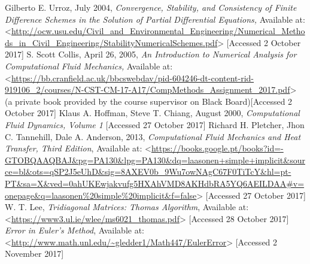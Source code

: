 \documentclass[12pt]{report}
\begin{document}
Gilberto E. Urroz, July 2004, \textit{Convergence, Stability, and Consistency of Finite
Difference Schemes in the Solution of Partial Differential
Equations,} Available at: <\url{http://ocw.usu.edu/Civil_and_Environmental_Engineering/Numerical_Methods_in_Civil_Engineering/StabilityNumericalSchemes.pdf}> [Accessed 2 October 2017]
\newline
\newline
S. Scott Collis, April 26, 2005, \textit{An Introduction to Numerical Analysis
for Computational Fluid Mechanics,} Available at: <\url{https://bb.cranfield.ac.uk/bbcswebdav/pid-604246-dt-content-rid-919106_2/courses/N-CST-CM-17-A17/CompMethods_Assignment_2017.pdf}> (a private book provided by the course supervisor on Black Board)[Accessed 2 October 2017]
\newline
\newline
Klaus A. Hoffman, Steve T. Chiang, August 2000, \textit{Computational Fluid Dynamics, Volume 1} [Accessed 27 October 2017]
\newline
\newline
Richard H. Pletcher, Jhon C. Tannehill, Dale A. Anderson, 2013, \textit{Computational Fluid Mechanics and Heat Transfer, Third Edition}, Available at: <\url{https://books.google.pt/books?id=-GTOBQAAQBAJ&pg=PA130&lpg=PA130&dq=laasonen+simple+implicit&source=bl&ots=qSP2J5eUhD&sig=8AXEV0b_9Wu7owNAgC67F0TiTcY&hl=pt-PT&sa=X&ved=0ahUKEwjakvufg5HXAhVMD8AKHdbRA5YQ6AEILDAA#v=onepage&q=laasonen\%20simple\%20implicit&f=false}> [Accessed 27 October 2017]
\newline
\newline
W. T. Lee, \textit{Tridiagonal Matrices: Thomas Algorithm}, Available at: <\url{https://www3.ul.ie/wlee/ms6021_thomas.pdf}> [Accessed 28 October 2017]
\newline
\newline
\textit{ Error in Euler’s Method}, Available at: <\url{http://www.math.unl.edu/~gledder1/Math447/EulerError}> [Accessed 2 November 2017]
\end{document}
